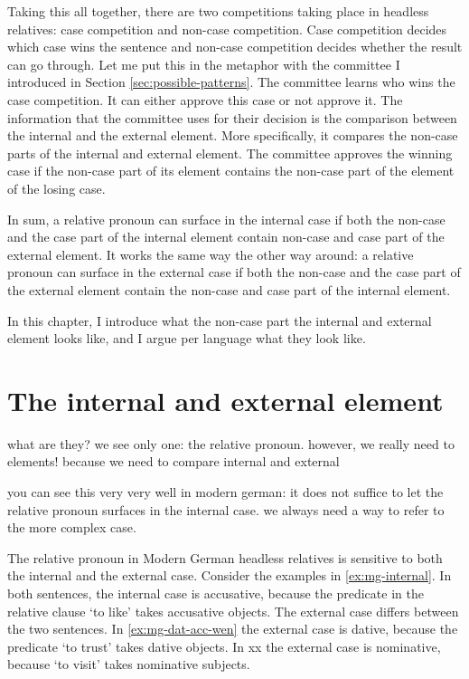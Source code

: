 Taking this all together, there are two competitions taking place in headless relatives: case competition and non-case competition. Case competition decides which case wins the sentence and non-case competition decides whether the result can go through. Let me put this in the metaphor with the committee I introduced in Section \ref{sec:possible-patterns}. The committee learns who wins the case competition. It can either approve this case or not approve it. The information that the committee uses for their decision is the comparison between the internal and the external element. More specifically, it compares the non-case parts of the internal and external element. The committee approves the winning case if the non-case part of its element contains the non-case part of the element of the losing case.

In sum, a relative pronoun can surface in the internal case if both the non-case and the case part of the internal element contain non-case and case part of the external element. It works the same way the other way around: a relative pronoun can surface in the external case if both the non-case and the case part of the external element contain the non-case and case part of the internal element.

In this chapter, I introduce what the non-case part the internal and external element looks like, and I argue per language what they look like.


\section{The internal and external element}\label{sec:int-ext-elements}

what are they? we see only one: the relative pronoun. however, we really need to elements! because we need to compare internal and external

you can see this very very well in modern german: it does not suffice to let the relative pronoun surfaces in the internal case. we always need a way to refer to the more complex case.



The relative pronoun in Modern German headless relatives is sensitive to both the internal and the external case. Consider the examples in \ref{ex:mg-internal}. In both sentences, the internal case is accusative, because the predicate in the relative clause  `to like' takes accusative objects. The external case differs between the two sentences. In \ref{ex:mg-dat-acc-wen} the external case is dative, because the predicate  `to trust' takes dative objects.  In xx the external case is nominative, because  `to visit' takes nominative subjects.


